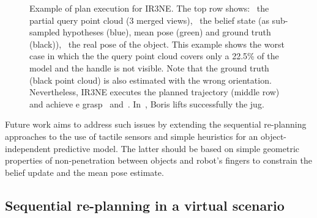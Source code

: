 \begin{figure}[!t]
 \caption[SPAM-PLAN results on Boris]{Example of plan execution for IR3NE. The top row shows:~ the partial query point cloud (3 merged views),~ the belief state (as sub-sampled hypotheses (blue), mean pose (green) and ground truth (black)),~ the real pose of the object. This example shows the worst case in which the the query point cloud covers only a 22.5\% of the model and the handle is not visible. Note that the ground truth~ (black point cloud) is also estimated with the wrong orientation. Nevertheless, IR3NE executes the planned trajectory (middle row) and achieve e grasp~ and~. In~, Boris lifts successfully the jug.}
\label{fig:07:boris.exec.example}
\end{figure} 

Future work aims to address such issues by extending the sequential re-planning approaches to the use of tactile sensors and simple heuristics for an object-independent predictive model. The latter should be based on simple geometric properties of non-penetration between objects and robot's fingers to constrain the belief update and the mean pose estimate.   


\subsection{Sequential re-planning in a virtual scenario}\label{sec:07:simulated_results_discussion}

